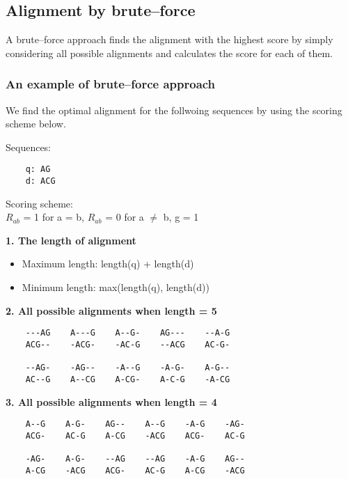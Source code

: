 %
%

%
%
\subsection{Alignment by brute--force}
A brute--force approach finds the alignment with the highest score by simply considering all possible alignments and calculates the score for each of them.

%
%
\subsubsection*{An example of brute--force approach}
We find the optimal alignment for the follwoing sequences by using the scoring scheme below.

\begin{multicols}{2}
Sequences:
\begin{verbatim}
    q: AG
    d: ACG
\end{verbatim}

\noindent Scoring scheme: \\ $R_{ab}$ = 1 for a = b, $R_{ab}$ = 0 for a $\neq$ b, g = 1
\end{multicols} 

\noindent \textbf{1. The length of alignment}
\begin{itemize}
\item Maximum length: length(q) + length(d)
\item Minimum length: max(length(q), length(d))
\end{itemize}
\medskip 

\noindent \textbf{2. All possible alignments when length = 5}
\begin{verbatim}
    ---AG    A---G    A--G-    AG---    --A-G
    ACG--    -ACG-    -AC-G    --ACG    AC-G-

    --AG-    -AG--    -A--G    -A-G-    A-G--
    AC--G    A--CG    A-CG-    A-C-G    -A-CG
\end{verbatim}
\medskip

\noindent \textbf{3. All possible alignments when length = 4}
\begin{verbatim}
    A--G    A-G-    AG--    A--G    -A-G    -AG-
    ACG-    AC-G    A-CG    -ACG    ACG-    AC-G

    -AG-    A-G-    --AG    --AG    -A-G    AG--
    A-CG    -ACG    ACG-    AC-G    A-CG    -ACG
\end{verbatim}
\medskip

